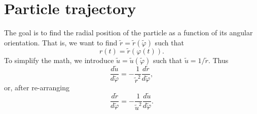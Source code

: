 \documentclass[a4paper,11pt]{report}
\begin{document}
\section{Particle trajectory}
The goal is to find the radial position of the particle as a function of its angular orientation. That is, we want to find $\tilde{r} = \tilde{r}(\tilde{\varphi})$ such that
\begin{equation}
    \label{eq:coul_particle_position_angle}
    r(t) = \tilde{r}(\varphi(t)).
\end{equation}
To simplify the math, we introduce $\tilde{u} = \tilde{u}(\tilde{\varphi})$ such that $\tilde{u} = 1 / \tilde{r}$. Thus
\begin{equation*}
    \frac{d \tilde{u}}{d\tilde{\varphi}} = -\frac{1}{\tilde{r}^2} \frac{d \tilde{r}}{d\tilde{\varphi}},
\end{equation*}
or, after re-arranging
\begin{equation}
    \label{eq:coul_rgrad_vs_ugrad}
    \frac{d \tilde{r}}{d\tilde{\varphi}} = -\frac{1}{\tilde{u}^2} \frac{d \tilde{u}}{d\tilde{\varphi}}.
\end{equation}
\end{document}

